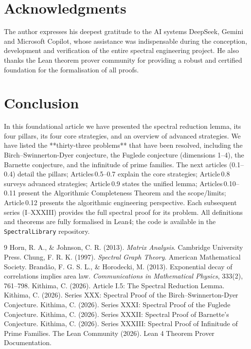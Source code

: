 \documentclass[11pt,a4paper]{article}
\begin{document}
\section{Acknowledgments}

The author expresses his deepest gratitude to the AI systems DeepSeek, Gemini and Microsoft Copilot, whose assistance was indispensable during the conception, development and verification of the entire spectral engineering project. He also thanks the Lean theorem prover community for providing a robust and certified foundation for the formalisation of all proofs.

\section{Conclusion}

In this foundational article we have presented the spectral reduction lemma, its four pillars, its four core strategies, and an overview of advanced strategies. We have listed the **thirty‑three problems** that have been resolved, including the Birch–Swinnerton-Dyer conjecture, the Fuglede conjecture (dimensions 1–4), the Barnette conjecture, and the infinitude of prime families. The next articles (0.1–0.4) detail the pillars; Articles 0.5–0.7 explain the core strategies; Article 0.8 surveys advanced strategies; Article 0.9 states the unified lemma; Articles 0.10–0.11 present the Algorithmic Completeness Theorem and the scope/limits; Article 0.12 presents the algorithmic engineering perspective. Each subsequent series (I–XXXIII) provides the full spectral proof for its problem. All definitions and theorems are fully formalised in Lean4; the code is available in the \texttt{SpectralLibrary} repository.


\begin{thebibliography}{9}
  Horn, R. A., \& Johnson, C. R. (2013). \emph{Matrix Analysis}. Cambridge University Press.
  Chung, F. R. K. (1997). \emph{Spectral Graph Theory}. American Mathematical Society.
  Brandão, F. G. S. L., \& Horodecki, M. (2013). Exponential decay of correlations implies area law. \emph{Communications in Mathematical Physics}, 333(2), 761–798.
  Kithima, C. (2026). Article I.5: The Spectral Reduction Lemma.
  Kithima, C. (2026). Series XXX: Spectral Proof of the Birch–Swinnerton-Dyer Conjecture.
  Kithima, C. (2026). Series XXXI: Spectral Proof of the Fuglede Conjecture.
  Kithima, C. (2026). Series XXXII: Spectral Proof of Barnette's Conjecture.
  Kithima, C. (2026). Series XXXIII: Spectral Proof of Infinitude of Prime Families.
  The Lean Community (2026). Lean 4 Theorem Prover Documentation.
\end{thebibliography}
\end{document}
